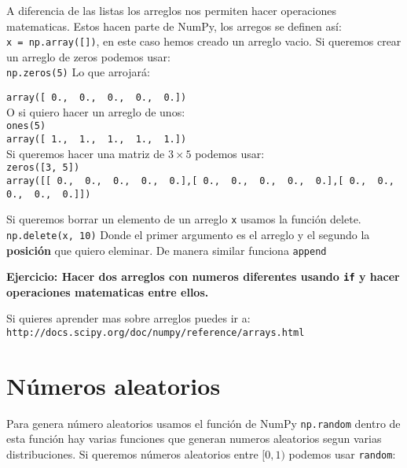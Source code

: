 \documentclass[12pt]{article}
\begin{document}
A diferencia de las listas los arreglos nos permiten hacer operaciones matematicas. Estos hacen parte 
de NumPy, los arregos se definen as\'i:\\

\verb+x = np.array([])+, en este caso hemos creado un arreglo vacio. Si queremos crear un arreglo de zeros 
podemos usar:\\

\verb+np.zeros(5)+ Lo que arrojar\'a: 
 
\verb+array([ 0.,  0.,  0.,  0.,  0.])+\\

O si quiero hacer un arreglo de unos:\\

\verb+ones(5)+ \\

\verb+array([ 1.,  1.,  1.,  1.,  1.])+\\

Si queremos hacer una matriz de $3\times5$ podemos usar:\\

\verb+zeros([3, 5])+\\

\verb+array([[ 0.,  0.,  0.,  0.,  0.],[ 0.,  0.,  0.,  0.,  0.],[ 0.,  0.,  0.,  0.,  0.]])+

Si queremos borrar un elemento de un arreglo \verb+x+ usamos la funci\'on delete. \\

\verb+np.delete(x, 10)+ Donde el primer argumento es el arreglo y el segundo la {\bf posici\'on} que quiero 
eleminar. De manera similar funciona \verb+append+

{\bf Ejercicio: Hacer dos arreglos con numeros diferentes usando \verb+if+ y hacer operaciones matematicas entre ellos.}

Si quieres aprender mas sobre arreglos puedes ir a: \\
\verb+http://docs.scipy.org/doc/numpy/reference/arrays.html+


\section{N\'umeros aleatorios}

Para genera n\'umero aleatorios usamos el funci\'on de NumPy \verb+np.random+ dentro de esta funci\'on
hay varias funciones que generan numeros aleatorios segun varias distribuciones. Si queremos n\'umeros
aleatorios entre $[0, 1)$ podemos usar \verb+random+:\\
\end{document}
